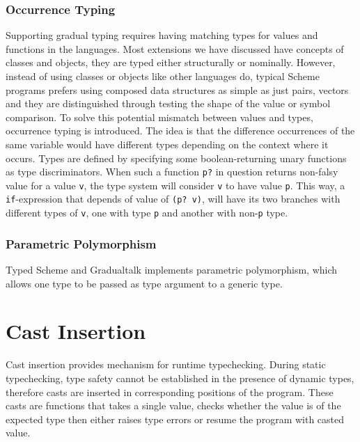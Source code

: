 \subsubsection{Occurrence Typing}


Supporting gradual typing requires having matching types for values and functions in the languages.
Most extensions we have discussed have concepts of classes and objects, they are typed either
structurally or nominally.
However, instead of using classes or objects like other languages do,
typical Scheme programs prefers using composed data structures as simple as just pairs, vectors
and they are distinguished through testing the shape of the value or symbol comparison.
To solve this potential mismatch between values and types, occurrence typing is introduced.
The idea is that the difference occurrences of the same variable would have different types
depending on the context where it occurs.
Types are defined by specifying some boolean-returning unary functions as type discriminators.
When such a function \texttt{p?} in question returns non-falsy value for a value \texttt{v},
the type system will consider \texttt{v} to have value \texttt{p}.
This way, a \texttt{if}-expression that depends of value of \texttt{(p? v)},
will have its two branches with different types of \texttt{v}, one with type \texttt{p}
and another with non-\texttt{p} type.

\subsubsection{Parametric Polymorphism}

Typed Scheme and Gradualtalk implements parametric polymorphism, which allows
one type to be passed as type argument to a generic type.


\section{Cast Insertion}

Cast insertion provides mechanism for runtime typechecking.
During static typechecking, type safety cannot be established in the presence of dynamic types,
therefore casts are inserted in corresponding positions of the program. These casts are functions
that takes a single value, checks whether the value is of the expected type then either
raises type errors or resume the program with casted value.

